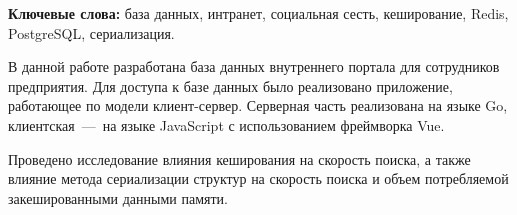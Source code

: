 \begin{essay}{}

\setcounter{page}{3}

\textbf{Ключевые слова:} база данных, интранет, социальная сесть, кеширование, Redis, PostgreSQL, сериализация.

В данной работе разработана база данных внутреннего портала для сотрудников предприятия. Для доступа к базе данных было реализовано приложение, работающее по модели клиент-сервер. Серверная часть реализована на языке Go, клиентская~---~на языке JavaScript с использованием фреймворка Vue.

Проведено исследование влияния кеширования на скорость поиска, а также влияние метода сериализации структур на скорость поиска и объем потребляемой закешированными данными памяти.

\end{essay}